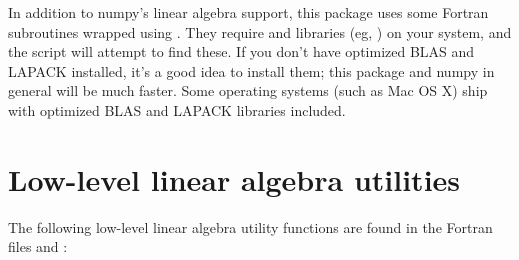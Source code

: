 \documentclass{manual}
\begin{document}
In addition to numpy's linear algebra support, this package uses some Fortran subroutines wrapped using . They require  and  libraries (eg, ) on your system, and the  script will attempt to find these. If you don't have optimized BLAS and LAPACK installed, it's a good idea to install them; this package and numpy in general will be much faster. Some operating systems (such as Mac OS X) ship with optimized BLAS and LAPACK libraries included.

\section{Low-level linear algebra utilities}
The following low-level linear algebra utility functions are found in the Fortran files  and  :
\end{document}
